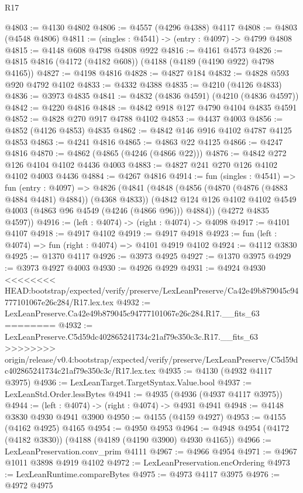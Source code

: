 \begin{lexlean}{R17}
\begin{coremodule}
{{{{{{{{{{{{{{{{{{{{{{{{{{{{{{{{{{{{{{{{{{{{{{{{{{{{{{{{{{{{{{{{{{{{{{{{{{{{{{{{{{{{{{{{{{{{{{{{{{{{{{{{{{{@4803 := @4130 @4802
@4806 := @4557 (@4296 @4388) @4117
@4808 := @4803 (@4548 @4806)
@4811 := (singles : @4541) -> (entry : @4097) -> @4799 @4808
@4815 := @4148 @608 @4798 @4808 @922
@4816 := @4161 @4573
@4826 := @4815 @4816 (@4172 (@4182 @608)) (@4188 (@4189 (@4190 @922) @4798 @4165))
@4827 := @4198 @4816
@4828 := @4827 @184
@4832 := @4828 @593 @920 @4792 @4102
@4833 := @4332 @4388
@4835 := @4210 (@4126 @4833)
@4836 := @3973 @4835
@4841 := @4832 (@4836 @4591) (@4210 (@4836 @4597))
@4842 := @4220 @4816
@4848 := @4842 @918 @127 @4790 @4104 @4835 @4591
@4852 := @4828 @270 @917 @4788 @4102
@4853 := @4437 @4003
@4856 := @4852 (@4126 @4853) @4835
@4862 := @4842 @146 @916 @4102 @4787 @4125 @4853
@4863 := @4241 @4816
@4865 := @4863 @22 @4125
@4866 := @4247 @4816
@4870 := @4862 (@4865 (@4246 (@4866 @22)))
@4876 := @4842 @272 @126 @4104 @4102 @4436 @4003
@4883 := @4827 @241 @270 @126 @4102 @4102 @4003 @4436
@4884 := @4267 @4816
@4914 := fun (singles : @4541) =>
  fun (entry : @4097) =>
  @4826
    (@4841
      (@4848
        (@4856 (@4870 (@4876 (@4883 @4884 @4481) @4884)) (@4368 @4833))
        (@4842 @124 @126 @4102 @4102 @4549 @4003 (@4863 @96 @4549 (@4246 (@4866 @96))) @4884))
      (@4272 @4835 @4597))
@4916 := (left : @4074) -> (right : @4074) -> @4098
@4917 := @4101 @4107
@4918 := @4917 @4102
@4919 := @4917 @4918
@4923 := fun (left : @4074) => fun (right : @4074) => @4101 @4919 @4102
@4924 := @4112 @3830
@4925 := @1370 @4117
@4926 := @3973 @4925
@4927 := @1370 @3975
@4929 := @3973 @4927 @4003
@4930 := @4926 @4929
@4931 := @4924 @4930
<<<<<<<< HEAD:bootstrap/expected/verify/preserve/LexLeanPreserve/Ca42e49b879045c94777101067e26c284/R17.lex.tex
@4932 := LexLeanPreserve.Ca42e49b879045c94777101067e26c284.R17.__fits_63
========
@4932 := LexLeanPreserve.C5d59dc402865241734c21af79e350c3c.R17.__fits_63
>>>>>>>> origin/release/v0.4:bootstrap/expected/verify/preserve/LexLeanPreserve/C5d59dc402865241734c21af79e350c3c/R17.lex.tex
@4935 := @4130 (@4932 @4117 @3975)
@4936 := LexLeanTarget.TargetSyntax.Value.bool
@4937 := LexLeanStd.Order.lessBytes
@4941 := @4935 (@4936 (@4937 @4117 @3975))
@4944 := (left : @4074) -> (right : @4074) -> @4931 @4941
@4948 := @4148 @3830 @4930 @4941 @3900
@4950 := @4155 (@4159 @4927)
@4953 := @4155 (@4162 @4925) @4165
@4954 := @4950 @4953
@4964 := @4948 @4954 (@4172 (@4182 @3830)) (@4188 (@4189 (@4190 @3900) @4930 @4165))
@4966 := LexLeanPreservation.conv_prim @4111
@4967 := @4966 @4954
@4971 := @4967 @1011 @3898 @4919 @4102
@4972 := LexLeanPreservation.encOrdering
@4973 := LexLeanRuntime.compareBytes
@4975 := @4973 @4117 @3975
@4976 := @4972 @4975
}}}}}}}}}}}}}}}}}}}}}}}}}}}}}}}}}}}}}}}}}}}}}}}}}}}}}}}}}}}}}}}}}}}}}}}}}}}}}}}}}}}}}}}}}}}}}}}}}}}}}}}}}}}
\end{coremodule}
\end{lexlean}
